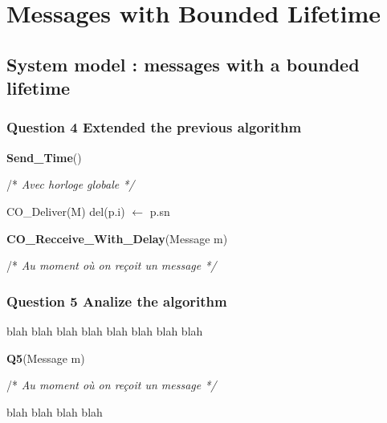 \chapter{Messages with Bounded Lifetime}

\section{System model : messages with a bounded lifetime}

\subsection{Question 4 Extended the previous algorithm}

\begin{algorithm}
\caption{\textbf{Send\_Time}()}
/* \textit{ Avec horloge globale */}
\label{algo:Q4a}
\begin{algorithmic}[1]
      \STATE  CO\_Deliver(M)
   del(p.i) $\leftarrow$ p.sn
   \ENDIF
   \ENDFOR
  \ENDIF
\end{algorithmic}
\end{algorithm}


\begin{algorithm}
\caption{\textbf{CO\_Recceive\_With\_Delay}(Message m)}
/* \textit{ Au moment où on reçoit un message */}
\label{algo:Q4b}
\begin{algorithmic}[1]
  \STATE Delete(m)
   \STATE  del(e.i) $\leftarrow$ e.sn
     \STATE  cb +=\{e.sn, e.i\}
     \STATE  CO\_Deliver(m)
     CO\_Receive(m\'~})
       \ENDFOR
       \ELSE
       \STATE ListMessages.add(m)
       \ENDIF
\end{algorithmic}
\end{algorithm}


\subsection{Question 5 Analize the algorithm}
 blah  blah  blah  blah  blah  blah  blah  blah 

\begin{algorithm}
\caption{\textbf{Q5}(Message m)}
/* \textit{ Au moment où on reçoit un message */}
\label{algo:Q5}
\begin{algorithmic}[1]
\end{algorithmic}
\end{algorithm}



 blah  blah  blah  blah 
